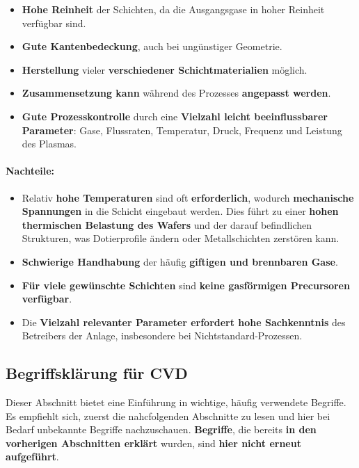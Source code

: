 \documentclass{article} %
\begin{document}
\begin{itemize}
    \item \textbf{Hohe Reinheit} der Schichten, da die Ausgangsgase in hoher Reinheit verfügbar sind.
    \item \textbf{Gute Kantenbedeckung}, auch bei ungünstiger Geometrie.
    \item \textbf{Herstellung} vieler \textbf{verschiedener Schichtmaterialien} möglich.
    \item \textbf{Zusammensetzung kann} während des Prozesses \textbf{angepasst werden}.
    \item \textbf{Gute Prozesskontrolle} durch eine \textbf{Vielzahl leicht beeinflussbarer Parameter}: Gase, Flussraten, Temperatur, Druck, Frequenz und Leistung 
    des Plasmas.
\end{itemize}

\vspace{1em}
\paragraph{Nachteile:}

\begin{itemize}
    \item Relativ \textbf{hohe Temperaturen} sind oft \textbf{erforderlich}, wodurch \textbf{mechanische Spannungen} in die Schicht eingebaut werden. Dies führt 
    zu einer \textbf{hohen thermischen Belastung des Wafers} und der darauf befindlichen Strukturen, was Dotierprofile ändern oder Metallschichten zerstören kann.
    \item \textbf{Schwierige Handhabung} der häufig \textbf{giftigen und brennbaren Gase}.
    \item \textbf{Für viele gewünschte Schichten} sind \textbf{keine gasförmigen Precursoren verfügbar}.
    \item Die \textbf{Vielzahl relevanter Parameter erfordert hohe Sachkenntnis} des Betreibers der Anlage, insbesondere bei Nichtstandard-Prozessen.
\end{itemize}

\vspace{1em}
\subsection{Begriffsklärung für CVD} %
Dieser Abschnitt bietet eine Einführung in wichtige, häufig verwendete Begriffe. Es empfiehlt sich, zuerst die nahcfolgenden Abschnitte zu lesen und hier bei Bedarf 
unbekannte Begriffe nachzuschauen. \textbf{Begriffe}, die bereits \textbf{in den vorherigen Abschnitten erklärt} wurden, sind \textbf{hier nicht erneut aufgeführt}.
\end{document}
